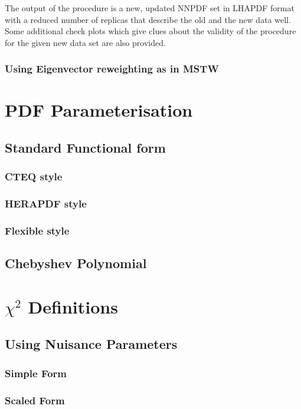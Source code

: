 \documentclass[11pt,a4paper]{article}
\begin{document}
The output of the procedure is a new, updated NNPDF set in LHAPDF format with a reduced number of replicas that describe the old and the new data well. 
Some additional check plots which give clues about the validity of the procedure for the given new data set are also provided.
\subsubsection{Using Eigenvector reweighting as in MSTW}
 
\section{PDF Parameterisation}
\label{sec:pdfparam}
\subsection{Standard Functional form}
\subsubsection{CTEQ style}
\subsubsection{HERAPDF style}
\subsubsection{Flexible style}
\subsection{Chebyshev Polynomial}

\section{$\chi^2$ Definitions}
\label{sec:chi2}
\subsection{Using Nuisance Parameters}
\subsubsection{Simple Form}

\subsubsection{Scaled Form}
\end{document}
